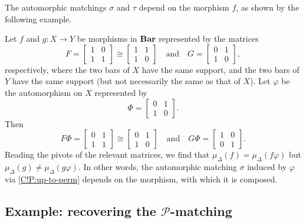 The automorphic matchings $\sigma$ and $\tau$ depend on the morphism $f$, as shown by the following example.

\begin{example}
  Let $f$ and $g \colon X \to Y$ be morphisms in $\Bar$ represented by the matrices
  \[
    F = \begin{bmatrix}
      1 & 0 \\
      1 & 1
    \end{bmatrix}
    \cong \begin{bmatrix}
      1 & 1 \\
      1 & 0
    \end{bmatrix}
    \quad \text{and} \quad
    G = \begin{bmatrix}
      0 & 1 \\
      1 & 0
    \end{bmatrix},
  \]
  respectively, where the two bars of $X$ have the same support, and the two bars of $Y$ have the same support (but not necessarily the same as that of $X$). Let $\varphi$ be the automorphism on $X$ represented by
  \[
    \Phi = \begin{bmatrix}
      0 & 1 \\
      1 & 0
    \end{bmatrix}.
  \]
  Then
  \[
    F \Phi =\begin{bmatrix}
      0 & 1 \\
      1 & 1
    \end{bmatrix}
    \cong \begin{bmatrix}
      0 & 1 \\
      1 & 0
    \end{bmatrix}
    \quad \text{and} \quad
    G \Phi = \begin{bmatrix}
      1 & 0 \\
      0 & 1
    \end{bmatrix}.
  \]
  Reading the pivots of the relevant matrices, we find that $\mu_\Delta(f) = \mu_\Delta(f \varphi)$ but $\mu_\Delta(g) \neq \mu_\Delta(g \varphi)$. In other words, the automorphic matching $\sigma$ induced by $\varphi$ via \cref{C!P:up-to-perm} depends on the morphism, with which it is composed.
\end{example}

\subsection{Example: recovering the \texorpdfstring{$\mathcal{P}$}{P}-matching}
\label{C!SS:P-matching}

